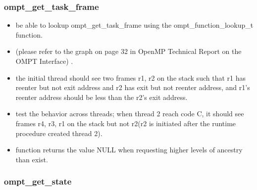 \documentclass{article}
\begin{document}
\subsubsection{ompt\_get\_task\_frame}

    \begin{itemize}
        \item  be able to lookup ompt\_get\_task\_frame using the ompt\_function\_lookup\_t function.
        \item (please refer to the graph on page 32 in OpenMP Technical Report on the OMPT Interface) \cite{MC2014}.        
        \item  the initial thread should see two frames r1, r2 on the stack such that r1 has reenter but not exit address and r2 has exit but not reenter address, and r1’s reenter address should be less than the r2’s exit address.
        \item test the behavior across threads; when thread 2 reach code C, it should see frames r4, r3, r1 on the stack but not r2(r2 is initiated after the runtime procedure created thread 2).
        \item function returns the value NULL when requesting higher levels of ancestry than exist.
    \end{itemize}


\subsubsection{ompt\_get\_state}
\end{document}
